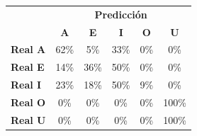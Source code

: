 \begin{tabular}{lccccc}
\toprule
 & \multicolumn{5}{c}{\textbf{Predicción}} \\
 & \textbf{A} & \textbf{E} & \textbf{I} & \textbf{O} & \textbf{U} \\
\midrule
\textbf{Real A} & \cellcolor[rgb]{0.57,0.57,1.00} \color{white} 62\% & \cellcolor[rgb]{0.97,0.97,1.00}  5\% & \cellcolor[rgb]{0.77,0.77,1.00}  33\% & \cellcolor[rgb]{1.00,1.00,1.00}  0\% & \cellcolor[rgb]{1.00,1.00,1.00}  0\% \\
\textbf{Real E} & \cellcolor[rgb]{0.90,0.90,1.00}  14\% & \cellcolor[rgb]{0.75,0.75,1.00}  36\% & \cellcolor[rgb]{0.65,0.65,1.00} \color{white} 50\% & \cellcolor[rgb]{1.00,1.00,1.00}  0\% & \cellcolor[rgb]{1.00,1.00,1.00}  0\% \\
\textbf{Real I} & \cellcolor[rgb]{0.84,0.84,1.00}  23\% & \cellcolor[rgb]{0.87,0.87,1.00}  18\% & \cellcolor[rgb]{0.65,0.65,1.00} \color{white} 50\% & \cellcolor[rgb]{0.94,0.94,1.00}  9\% & \cellcolor[rgb]{1.00,1.00,1.00}  0\% \\
\textbf{Real O} & \cellcolor[rgb]{1.00,1.00,1.00}  0\% & \cellcolor[rgb]{1.00,1.00,1.00}  0\% & \cellcolor[rgb]{1.00,1.00,1.00}  0\% & \cellcolor[rgb]{1.00,1.00,1.00}  0\% & \cellcolor[rgb]{0.30,0.30,1.00} \color{white} 100\% \\
\textbf{Real U} & \cellcolor[rgb]{1.00,1.00,1.00}  0\% & \cellcolor[rgb]{1.00,1.00,1.00}  0\% & \cellcolor[rgb]{1.00,1.00,1.00}  0\% & \cellcolor[rgb]{1.00,1.00,1.00}  0\% & \cellcolor[rgb]{0.30,0.30,1.00} \color{white} 100\% \\
\bottomrule
\end{tabular}